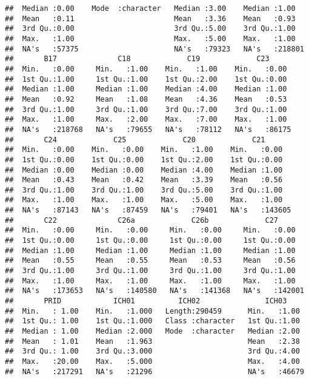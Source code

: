 \documentclass[
]{article}
\begin{document}
\begin{verbatim}
##  Median :0.00    Mode  :character   Median :3.00    Median :1.00    
##  Mean   :0.11                       Mean   :3.36    Mean   :0.93    
##  3rd Qu.:0.00                       3rd Qu.:5.00    3rd Qu.:1.00    
##  Max.   :1.00                       Max.   :5.00    Max.   :1.00    
##  NA's   :57375                      NA's   :79323   NA's   :218801  
##       B17              C18             C19             C23       
##  Min.   :0.00     Min.   :1.00    Min.   :1.00    Min.   :0.00   
##  1st Qu.:1.00     1st Qu.:1.00    1st Qu.:2.00    1st Qu.:0.00   
##  Median :1.00     Median :1.00    Median :4.00    Median :1.00   
##  Mean   :0.92     Mean   :1.08    Mean   :4.36    Mean   :0.53   
##  3rd Qu.:1.00     3rd Qu.:1.00    3rd Qu.:7.00    3rd Qu.:1.00   
##  Max.   :1.00     Max.   :2.00    Max.   :7.00    Max.   :1.00   
##  NA's   :218768   NA's   :79655   NA's   :78112   NA's   :86175  
##       C24             C25             C20             C21        
##  Min.   :0.00    Min.   :0.00    Min.   :1.00    Min.   :0.00    
##  1st Qu.:0.00    1st Qu.:0.00    1st Qu.:2.00    1st Qu.:0.00    
##  Median :0.00    Median :0.00    Median :4.00    Median :1.00    
##  Mean   :0.43    Mean   :0.42    Mean   :3.39    Mean   :0.56    
##  3rd Qu.:1.00    3rd Qu.:1.00    3rd Qu.:5.00    3rd Qu.:1.00    
##  Max.   :1.00    Max.   :1.00    Max.   :5.00    Max.   :1.00    
##  NA's   :87143   NA's   :87459   NA's   :79401   NA's   :143605  
##       C22              C26a             C26b             C27        
##  Min.   :0.00     Min.   :0.00     Min.   :0.00     Min.   :0.00    
##  1st Qu.:0.00     1st Qu.:0.00     1st Qu.:0.00     1st Qu.:0.00    
##  Median :1.00     Median :1.00     Median :1.00     Median :1.00    
##  Mean   :0.55     Mean   :0.55     Mean   :0.53     Mean   :0.56    
##  3rd Qu.:1.00     3rd Qu.:1.00     3rd Qu.:1.00     3rd Qu.:1.00    
##  Max.   :1.00     Max.   :1.00     Max.   :1.00     Max.   :1.00    
##  NA's   :173653   NA's   :140580   NA's   :141368   NA's   :142001  
##       PRID            ICH01          ICH02               ICH03      
##  Min.   : 1.00    Min.   :1.000   Length:290459      Min.   :1.00   
##  1st Qu.: 1.00    1st Qu.:1.000   Class :character   1st Qu.:1.00   
##  Median : 1.00    Median :2.000   Mode  :character   Median :2.00   
##  Mean   : 1.01    Mean   :1.963                      Mean   :2.38   
##  3rd Qu.: 1.00    3rd Qu.:3.000                      3rd Qu.:4.00   
##  Max.   :20.00    Max.   :5.000                      Max.   :4.00   
##  NA's   :217291   NA's   :21296                      NA's   :46679  

\end{verbatim}
\end{document}
